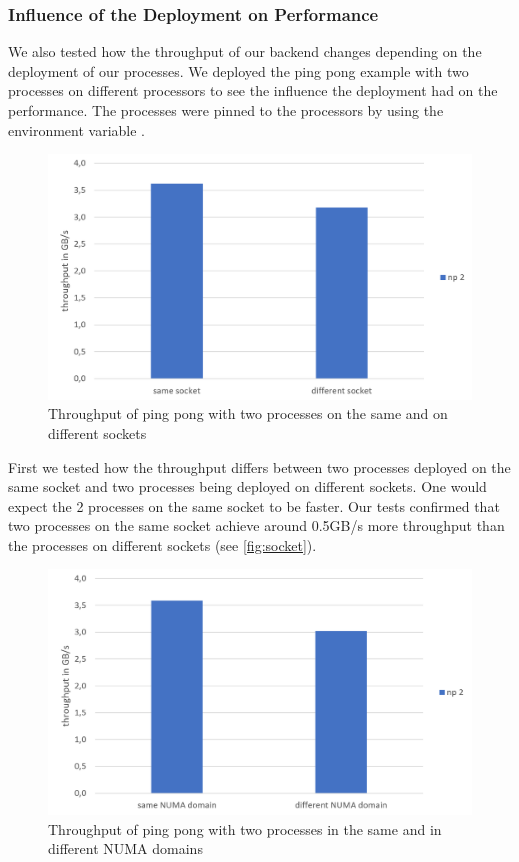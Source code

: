 \subsubsection{Influence of the Deployment on Performance}

We also tested how the throughput of our backend changes depending on the deployment of our processes.
We deployed the ping pong example with two processes on different processors to see the influence the deployment had on the performance.
The processes were pinned to the processors by using the environment variable .

\begin{figure}[h]
	\centering
	\includegraphics[width=0.70\columnwidth]{figures/socket.png}
	\caption{Throughput of ping pong with two processes on the same and on different sockets}
	\label{fig:socket}
\end{figure}

First we tested how the throughput differs between two processes deployed on the same socket and two processes being deployed on different sockets.
One would expect the 2 processes on the same socket to be faster.
Our tests confirmed that two processes on the same socket achieve around 0.5GB/s more throughput than the processes on different sockets (see \autoref{fig:socket}). 

\begin{figure}[h]
	\centering
	\includegraphics[width=0.70\columnwidth]{figures/numa.png}
	\caption{Throughput of ping pong with two processes in the same and in different NUMA domains}
	\label{fig:numa}
\end{figure}

